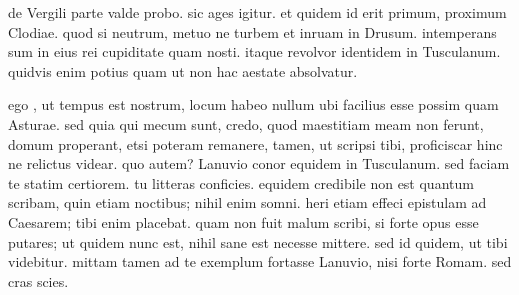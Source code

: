 


 de Vergili parte valde probo. sic ages igitur. et quidem id erit primum, proximum Clodiae. quod si neutrum, metuo ne turbem et inruam in Drusum. intemperans sum in eius rei cupiditate quam nosti. itaque revolvor identidem in Tusculanum. quidvis enim potius quam ut non hac aestate absolvatur.

 ego , ut tempus est nostrum, locum habeo nullum ubi facilius esse possim quam Asturae. sed quia qui mecum sunt, credo, quod maestitiam meam non ferunt, domum properant, etsi poteram remanere, tamen, ut scripsi tibi, proficiscar hinc ne relictus videar. quo autem? Lanuvio conor equidem in Tusculanum. sed faciam te statim certiorem. tu litteras conficies. equidem credibile non est quantum scribam, quin etiam noctibus; nihil enim somni. heri etiam effeci epistulam ad Caesarem; tibi enim placebat. quam non fuit malum scribi, si forte opus esse putares; ut quidem nunc est, nihil sane est necesse mittere. sed id quidem, ut tibi videbitur. mittam tamen ad te exemplum fortasse Lanuvio, nisi forte Romam. sed cras scies.
